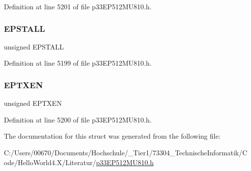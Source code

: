 Definition at line 5201 of file p33\+E\+P512\+M\+U810.\+h.

\mbox{\label{structtag_u1_e_p10_b_i_t_s_a47042104f04ebe06a23f9789bd400d7e}} 
\subsubsection{\texorpdfstring{E\+P\+S\+T\+A\+LL}{EPSTALL}}
{\footnotesize\ttfamily unsigned E\+P\+S\+T\+A\+LL}



Definition at line 5199 of file p33\+E\+P512\+M\+U810.\+h.

\mbox{\label{structtag_u1_e_p10_b_i_t_s_aa2d88c1be513e759c136823c86a355b4}} 
\subsubsection{\texorpdfstring{E\+P\+T\+X\+EN}{EPTXEN}}
{\footnotesize\ttfamily unsigned E\+P\+T\+X\+EN}



Definition at line 5200 of file p33\+E\+P512\+M\+U810.\+h.



The documentation for this struct was generated from the following file\+:\begin{DoxyCompactItemize}
\item 
C\+:/\+Users/00670/\+Documents/\+Hochschule/\+\_\+\+Tier1/73304\+\_\+\+Technische\+Informatik/\+Code/\+Hello\+World4.\+X/\+Literatur/\hyperlink{p33_e_p512_m_u810_8h}{p33\+E\+P512\+M\+U810.\+h}\end{DoxyCompactItemize}
